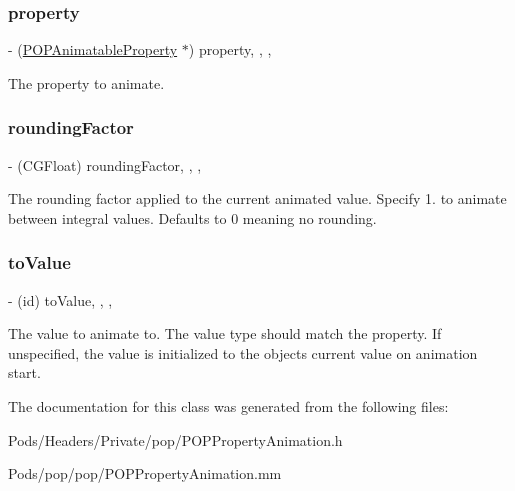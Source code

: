 \subsubsection{\texorpdfstring{property}{property}}
{\footnotesize\ttfamily -\/ (\mbox{\hyperlink{interface_p_o_p_animatable_property}{P\+O\+P\+Animatable\+Property}} $\ast$) property\hspace{0.3cm}{\ttfamily [read]}, {\ttfamily [write]}, {\ttfamily [nonatomic]}, {\ttfamily [strong]}}

The property to animate. \mbox{\label{interface_p_o_p_property_animation_a14751fc182bfacadf13daa2d93c46ee5}} 
\subsubsection{\texorpdfstring{rounding\+Factor}{roundingFactor}}
{\footnotesize\ttfamily -\/ (C\+G\+Float) rounding\+Factor\hspace{0.3cm}{\ttfamily [read]}, {\ttfamily [write]}, {\ttfamily [nonatomic]}, {\ttfamily [assign]}}

The rounding factor applied to the current animated value.  Specify 1. to animate between integral values. Defaults to 0 meaning no rounding. \mbox{\label{interface_p_o_p_property_animation_aeaebfaa7cade680e9bc7eca0bef0756a}} 
\subsubsection{\texorpdfstring{to\+Value}{toValue}}
{\footnotesize\ttfamily -\/ (id) to\+Value\hspace{0.3cm}{\ttfamily [read]}, {\ttfamily [write]}, {\ttfamily [nonatomic]}, {\ttfamily [copy]}}

The value to animate to.  The value type should match the property. If unspecified, the value is initialized to the object\textquotesingle{}s current value on animation start. 

The documentation for this class was generated from the following files\+:\begin{DoxyCompactItemize}
\item 
Pods/\+Headers/\+Private/pop/P\+O\+P\+Property\+Animation.\+h\item 
Pods/pop/pop/P\+O\+P\+Property\+Animation.\+mm\end{DoxyCompactItemize}

